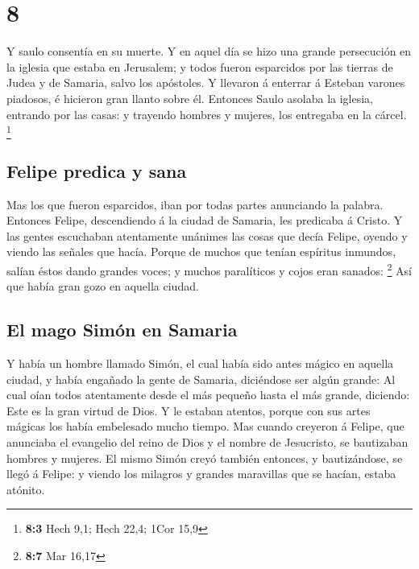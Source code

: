 \hypertarget{section-7}{%
\section{8}\label{section-7}}

 Y saulo consentía en su muerte. Y en aquel día se hizo una
grande persecución en la iglesia que estaba en Jerusalem; y todos fueron
esparcidos por las tierras de Judea y de Samaria, salvo los apóstoles.
 Y llevaron á enterrar á Esteban varones piadosos, é
hicieron gran llanto sobre él.  Entonces Saulo asolaba la
iglesia, entrando por las casas: y trayendo hombres y mujeres, los
entregaba en la cárcel. \footnote{\textbf{8:3} Hech 9,1; Hech 22,4; 1Cor
  15,9}

\hypertarget{felipe-predica-y-sana}{%
\subsection{Felipe predica y sana}\label{felipe-predica-y-sana}}

 Mas los que fueron esparcidos, iban por todas partes
anunciando la palabra.  Entonces Felipe, descendiendo á la
ciudad de Samaria, les predicaba á Cristo.  Y las gentes
escuchaban atentamente unánimes las cosas que decía Felipe, oyendo y
viendo las señales que hacía.  Porque de muchos que tenían
espíritus inmundos, salían éstos dando grandes voces; y muchos
paralíticos y cojos eran sanados: \footnote{\textbf{8:7} Mar 16,17}
 Así que había gran gozo en aquella ciudad.

\hypertarget{el-mago-simuxf3n-en-samaria}{%
\subsection{El mago Simón en
Samaria}\label{el-mago-simuxf3n-en-samaria}}

 Y había un hombre llamado Simón, el cual había sido antes
mágico en aquella ciudad, y había engañado la gente de Samaria,
diciéndose ser algún grande:  Al cual oían todos
atentamente desde el más pequeño hasta el más grande, diciendo: Este es
la gran virtud de Dios.  Y le estaban atentos, porque con
sus artes mágicas los había embelesado mucho tiempo.  Mas
cuando creyeron á Felipe, que anunciaba el evangelio del reino de Dios y
el nombre de Jesucristo, se bautizaban hombres y mujeres. 
El mismo Simón creyó también entonces, y bautizándose, se llegó á
Felipe: y viendo los milagros y grandes maravillas que se hacían, estaba
atónito.

